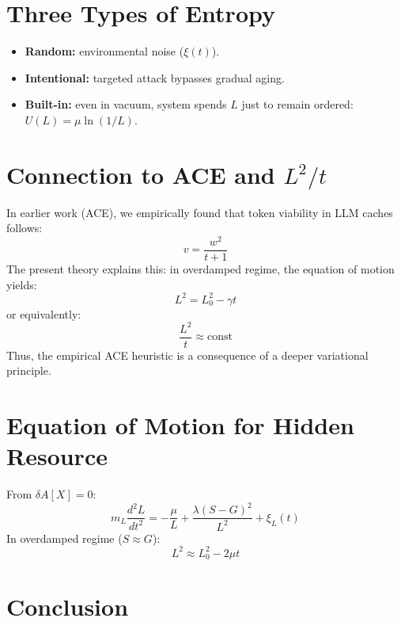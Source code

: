 \documentclass[11pt,a4paper]{article}
\begin{document}
\section{Three Types of Entropy}

\begin{itemize}
    \item \textbf{Random:} environmental noise ($\xi(t)$).
    \item \textbf{Intentional:} targeted attack bypasses gradual aging.
    \item \textbf{Built-in:} even in vacuum, system spends $L$ just to remain ordered: $U(L) = \mu \ln(1/L)$.
\end{itemize}

\section{Connection to ACE and $L^2/t$}

In earlier work (ACE), we empirically found that token viability in LLM caches follows:
\begin{equation}
v = \frac{w^2}{t+1}
\end{equation}
The present theory explains this: in overdamped regime, the equation of motion yields:
\begin{equation}
L^2 = L_0^2 - \gamma t
\end{equation}
or equivalently:
\begin{equation}
\frac{L^2}{t} \approx \text{const}
\end{equation}
Thus, the empirical ACE heuristic is a consequence of a deeper variational principle.

\section{Equation of Motion for Hidden Resource}

From $\delta A[X] = 0$:
\begin{equation}
m_L \frac{d^2L}{dt^2} = -\frac{\mu}{L} + \frac{\lambda(S-G)^2}{L^2} + \xi_L(t)
\end{equation}
In overdamped regime ($S \approx G$):
\begin{equation}
L^2 \approx L_0^2 - 2\mu t
\end{equation}

\section{Conclusion}
\end{document}
